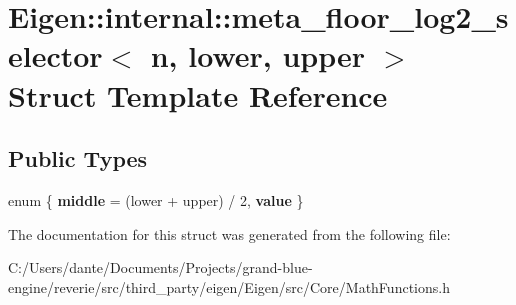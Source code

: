 \hypertarget{struct_eigen_1_1internal_1_1meta__floor__log2__selector}{}\section{Eigen\+::internal\+::meta\+\_\+floor\+\_\+log2\+\_\+selector$<$ n, lower, upper $>$ Struct Template Reference}
\label{struct_eigen_1_1internal_1_1meta__floor__log2__selector}
\subsection*{Public Types}
\begin{DoxyCompactItemize}
\item 
\mbox{\label{struct_eigen_1_1internal_1_1meta__floor__log2__selector_a432eadfe445f6e466f05265443267310}} 
enum \{ {\bfseries middle} = (lower + upper) / 2, 
{\bfseries value}
 \}
\end{DoxyCompactItemize}


The documentation for this struct was generated from the following file\+:\begin{DoxyCompactItemize}
\item 
C\+:/\+Users/dante/\+Documents/\+Projects/grand-\/blue-\/engine/reverie/src/third\+\_\+party/eigen/\+Eigen/src/\+Core/Math\+Functions.\+h\end{DoxyCompactItemize}

